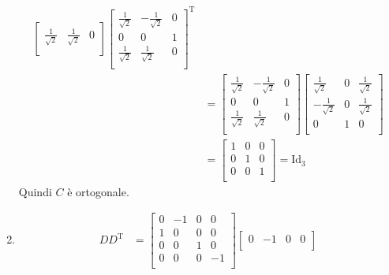 \documentclass{article}
\begin{document}
\begin{enumerate}
\begin{equation*}
\begin{aligned}
\begin{bmatrix}
            \frac{1}{\sqrt{2}} & \frac{1}{\sqrt{2}} & 0 \\
        \end{bmatrix}
        \begin{bmatrix}
            \frac{1}{\sqrt{2}} & -\frac{1}{\sqrt{2}} & 0 \\
            0 & 0 & 1 \\
            \frac{1}{\sqrt{2}} & \frac{1}{\sqrt{2}} & 0 \\
        \end{bmatrix}^\text{T} \\ &=
        \begin{bmatrix}
            \frac{1}{\sqrt{2}} & -\frac{1}{\sqrt{2}} & 0 \\
            0 & 0 & 1 \\
            \frac{1}{\sqrt{2}} & \frac{1}{\sqrt{2}} & 0 \\
        \end{bmatrix}
        \begin{bmatrix}
            \frac{1}{\sqrt{2}} & 0 & \frac{1}{\sqrt{2}} \\
            -\frac{1}{\sqrt{2}} & 0 & \frac{1}{\sqrt{2}} \\
            0 & 1 & 0 \\
        \end{bmatrix} \\ &=
        \begin{bmatrix}
            1 & 0 & 0 \\
            0 & 1 & 0 \\
            0 & 0 & 1 \\
        \end{bmatrix} = \text{Id}_3
    \end{aligned}\end{equation*}
    Quindi $C$ è ortogonale.
    \item \begin{equation*}\begin{aligned}
        DD^\text{T} &=
        \begin{bmatrix}
            0 & -1 & 0 & 0 \\
            1 & 0 & 0 & 0 \\
            0 & 0 & 1 & 0 \\
            0 & 0 & 0 & -1 \\
        \end{bmatrix}
        \begin{bmatrix}
            0 & -1 & 0 & 0 \\

\end{bmatrix}
\end{aligned}
\end{equation*}
\end{enumerate}
\end{document}
